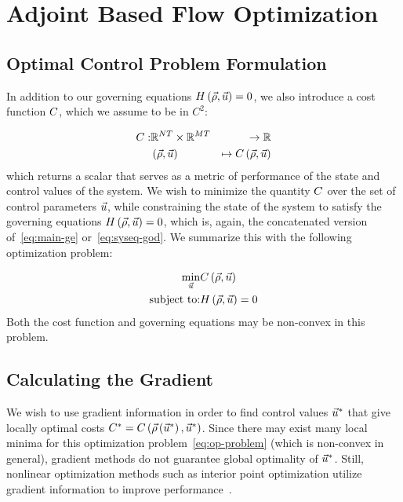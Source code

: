 \section{Adjoint Based Flow Optimization\label{sec:Adjoint-method}}


\subsection{Optimal Control Problem Formulation\label{par:Optimization-Problem}}

In addition to our governing equations $H\left(\vec{\rho},\vec{u}\right)=0$,
we also introduce a cost function $C$, which we assume to be
in $C^{2}$:

\begin{eqnarray*}
	C: & \mathbb{R}^{N T}\times\mathbb{R}^{M T} & \rightarrow\mathbb{R}\\
	& \left(\vec{\rho},\vec{u}\right) & \mapsto C\left(\vec{\rho},\vec{u}\right)
\end{eqnarray*}
which returns a scalar that serves as a metric of performance of the
state and control values of the system. We wish to minimize the quantity
$C$ over the set of control parameters $\vec{u}$, while constraining
the state of the system to satisfy the governing equations $H\left(\vec{\rho},\vec{u}\right)=0$,
which is, again, the concatenated version of~\eqref{eq:main-ge} or~\eqref{eq:syseq-god}.
We summarize this with the following optimization problem:

\begin{eqnarray}
	\underset{\vec{u}}{\min} & C\left(\vec{\rho},\vec{u}\right)\nonumber \\
	\text{subject to:} & H\left(\vec{\rho},\vec{u}\right)=0\label{eq:op-problem}
\end{eqnarray}
Both the cost function and governing equations may be non-convex in
this problem.


\subsection{Calculating the Gradient\label{par:Calculating-the-gradient}}

We wish to use gradient information in order to find control values
$\vec{u}^{*}$ that give locally optimal costs $C^{*}=C\left(\vec{\rho}\left(\vec{u}^{*}\right),\vec{u}^{*}\right)$.
Since there may exist many local minima for this optimization problem~\eqref{eq:op-problem}
(which is non-convex in general), gradient\emph{ }methods do not guarantee
global optimality of $\vec{u}^{*}$\emph{. }Still, nonlinear optimization
methods such as interior point optimization utilize gradient information
to improve performance~\cite{Andreas2005}.

